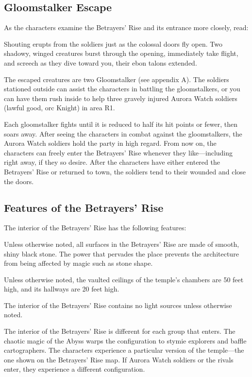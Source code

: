 \documentclass[10pt,a4paper,twoside,twocolumn,openany,nodeprecatedcode]{dndbook}
\begin{document}
\subsection{Gloomstalker Escape}
As the characters examine the Betrayers' Rise and its entrance more closely, read:

\begin{DndReadAloud}{}
Shouting erupts from the soldiers just as the colossal doors fly open. Two shadowy, winged creatures burst through the opening, immediately take flight, and screech as they dive toward you, their ebon talons extended.

\end{DndReadAloud}

The escaped creatures are two Gloomstalker (see appendix A). The soldiers stationed outside can assist the characters in battling the gloomstalkers, or you can have them rush inside to help three gravely injured Aurora Watch soldiers (lawful good, orc Knight) in area R1.

Each gloomstalker fights until it is reduced to half its hit points or fewer, then soars away. After seeing the characters in combat against the gloomstalkers, the Aurora Watch soldiers hold the party in high regard. From now on, the characters can freely enter the Betrayers' Rise whenever they like—including right away, if they so desire. After the characters have either entered the Betrayers' Rise or returned to town, the soldiers tend to their wounded and close the doors.

\subsection{Features of the Betrayers' Rise}
The interior of the Betrayers' Rise has the following features:


\begin{description}[nolistsep]
\item[Black Stone.]
Unless otherwise noted, all surfaces in the Betrayers' Rise are made of smooth, shiny black stone. The power that pervades the place prevents the architecture from being affected by magic such as stone shape.
\item[Ceilings.]
Unless otherwise noted, the vaulted ceilings of the temple's chambers are 50 feet high, and its hallways are 20 feet high.
\item[Light.]
The interior of the Betrayers' Rise contains no light sources unless otherwise noted.
\item[Shifting Halls.]
The interior of the Betrayers' Rise is different for each group that enters. The chaotic magic of the Abyss warps the configuration to stymie explorers and baffle cartographers. The characters experience a particular version of the temple—the one shown on the Betrayers' Rise map. If Aurora Watch soldiers or the rivals enter, they experience a different configuration.
\end{description}
\end{document}

